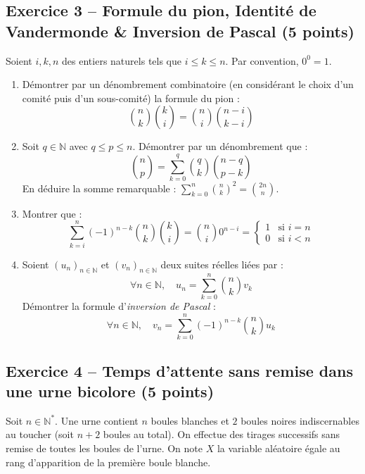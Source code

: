 \documentclass[11pt,a4paper]{article}
\newcommand{\N}{\mathbb{N}}
\begin{document}
\vspace{0.3cm}

\subsection*{Exercice 3 -- Formule du pion, Identité de Vandermonde \& Inversion de Pascal \hfill (5 points)}

Soient $i, k, n$ des entiers naturels tels que $i \le k \le n$. Par convention, $0^0 = 1$.
\begin{enumerate}
    \item Démontrer par un dénombrement combinatoire (en considérant le choix d'un comité puis d'un sous-comité) la formule du pion :
    \[
    \binom{n}{k} \binom{k}{i} = \binom{n}{i} \binom{n - i}{k - i}
    \]
    \item Soit $q \in \N$ avec $q \le p \le n$. Démontrer par un dénombrement que :
    \[
    \binom{n}{p} = \sum_{k=0}^q \binom{q}{k} \binom{n - q}{p - k}
    \]
    En déduire la somme remarquable : $\displaystyle\sum_{k=0}^n \binom{n}{k}^2 = \binom{2n}{n}$.
    \item Montrer que :
    \[
    \sum_{k=i}^n (-1)^{n - k} \binom{n}{k} \binom{k}{i} = \binom{n}{i} 0^{n - i} = \begin{cases} 1 & \text{si } i = n \\ 0 & \text{si } i < n \end{cases}
    \]
    \item Soient $(u_n)_{n \in \N}$ et $(v_n)_{n \in \N}$ deux suites réelles liées par :
    \[
    \forall n \in \N, \quad u_n = \sum_{k=0}^n \binom{n}{k} v_k
    \]
    Démontrer la formule d'\emph{inversion de Pascal} :
    \[
    \forall n \in \N, \quad v_n = \sum_{k=0}^n (-1)^{n - k} \binom{n}{k} u_k
    \]
\end{enumerate}

\vspace{0.3cm}

\subsection*{Exercice 4 -- Temps d'attente sans remise dans une urne bicolore \hfill (5 points)}

Soit $n \in \N^*$. Une urne contient $n$ boules blanches et $2$ boules noires indiscernables au toucher (soit $n+2$ boules au total).
On effectue des tirages successifs sans remise de toutes les boules de l'urne.
On note $X$ la variable aléatoire égale au rang d'apparition de la première boule blanche.
\end{document}
